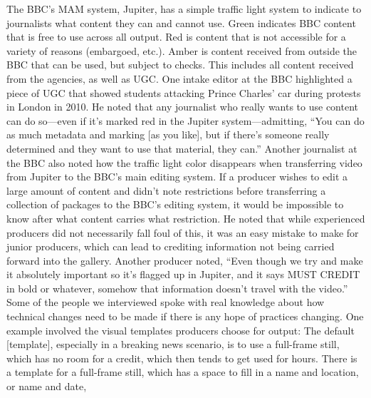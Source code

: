 \begin{enumerate}
The BBC's MAM system, Jupiter, has a simple traffic light system to indicate
to journalists what content they can and cannot use. Green indicates BBC
content that is free to use across all output. Red is content that is not accessible
for a variety of reasons (embargoed, etc.). Amber is content received
from outside the BBC that can be used, but subject to checks. This includes
all content received from the agencies, as well as UGC.
One intake editor at the BBC highlighted a piece of UGC that showed students
attacking Prince Charles' car during protests in London in 2010. He
noted that any journalist who really wants to use content can do so—even
if it's marked red in the Jupiter system—admitting, ``You can do as much
metadata and marking [as you like], but if there's someone really determined
and they want to use that material, they can.''
Another journalist at the BBC also noted how the traffic light color disappears
when transferring video from Jupiter to the BBC's main editing system.
If a producer wishes to edit a large amount of content and didn't note
restrictions before transferring a collection of packages to the BBC's editing
system, it would be impossible to know after what content carries what
restriction. He noted that while experienced producers did not necessarily
fall foul of this, it was an easy mistake to make for junior producers, which
can lead to crediting information not being carried forward into the gallery.
Another producer noted, ``Even though we try and make it absolutely
important so it's flagged up in Jupiter, and it says MUST CREDIT in bold or
whatever, somehow that information doesn't travel with the video.''
Some of the people we interviewed spoke with real knowledge about how
technical changes need to be made if there is any hope of practices changing.
One example involved the visual templates producers choose for output:
The default [template], especially in a breaking news scenario, is to
use a full-frame still, which has no room for a credit, which then
tends to get used for hours. There is a template for a full-frame still,
which has a space to fill in a name and location, or name and date,


\end{enumerate}
